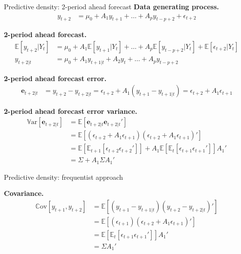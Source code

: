 \documentclass[notes,blackandwhite,mathsans,usenames,dvipsnames]{beamer}
\begin{document}
\begin{frame}{Predictive density: 2-period ahead forecast}
\small
\textbf{Data generating process.}
\begin{align*}
y_{t+2} &= \mu_0 + A_1 y_{t+1} + \dots + A_p y_{t-p+2} + \epsilon_{t+2}
\end{align*} 

\smallskip\textbf{2-period ahead forecast.}
\begin{align*}
\mathbb{E}[y_{t+2}|Y_t] &= \mu_0 + A_1 \mathbb{E}[y_{t+1}|Y_t] + \dots + A_p \mathbb{E}[y_{t-p+2}|Y_t] + \mathbb{E}[\epsilon_{t+2}|Y_t]\\
y_{t+2|t} &= \mu_0 + A_1 y_{t+1|t} + A_2 y_{t} + \dots + A_p y_{t-p+2}
\end{align*} 

\smallskip\textbf{2-period ahead forecast error.}
\begin{align*}
\mathbf{e}_{t+2|t} &= y_{t+2} - y_{t+2|t} = \epsilon_{t+2} + A_1(y_{t+1} - y_{t+1|t}) = \epsilon_{t+2} + A_1\epsilon_{t+1}
\end{align*} 

\smallskip\textbf{2-period ahead forecast error variance.}
\begin{align*}
\mathbb{V}\text{ar}[\mathbf{e}_{t+2|t}] &= \mathbb{E}[\mathbf{e}_{t+2|t}\mathbf{e}_{t+2|t}'] \\
&= \mathbb{E}[(\epsilon_{t+2} + A_1\epsilon_{t+1})(\epsilon_{t+2} + A_1\epsilon_{t+1})'] \\
&= \mathbb{E}\left[\mathbb{E}_{t+1}[\epsilon_{t+2}\epsilon_{t+2}']\right] + A_1\mathbb{E}\left[\mathbb{E}_t[\epsilon_{t+1}\epsilon_{t+1}']\right]A_1' \\
&= \Sigma + A_1\Sigma A_1' 
\end{align*} 

\end{frame}




\begin{frame}{Predictive density: frequentist approach}

\textbf{Covariance.}
\begin{align*}
\mathbb{C}\text{ov}[y_{t+1},y_{t+2}] &= \mathbb{E}\left[ (y_{t+1} - y_{t+1|t})(y_{t+2} - y_{t+2|t})' \right]\\
&= \mathbb{E}\left[ (\epsilon_{t+1})(\epsilon_{t+2} + A_1\epsilon_{t+1})' \right]\\
&= \mathbb{E}\left[ \mathbb{E}_t[\epsilon_{t+1}\epsilon_{t+1}']  \right]A_1' \\
&= \Sigma A_1'
\end{align*} 

\end{frame}
\end{document}
